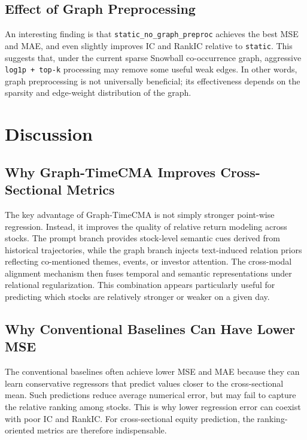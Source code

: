 \subsection{Effect of Graph Preprocessing}

An interesting finding is that \texttt{static\_no\_graph\_preproc} achieves the best MSE and MAE, and even slightly improves IC and RankIC relative to \texttt{static}. This suggests that, under the current sparse Snowball co-occurrence graph, aggressive \texttt{log1p + top-k} processing may remove some useful weak edges. In other words, graph preprocessing is not universally beneficial; its effectiveness depends on the sparsity and edge-weight distribution of the graph.

\section{Discussion}

\subsection{Why Graph-TimeCMA Improves Cross-Sectional Metrics}

The key advantage of Graph-TimeCMA is not simply stronger point-wise regression. Instead, it improves the quality of relative return modeling across stocks. The prompt branch provides stock-level semantic cues derived from historical trajectories, while the graph branch injects text-induced relation priors reflecting co-mentioned themes, events, or investor attention. The cross-modal alignment mechanism then fuses temporal and semantic representations under relational regularization. This combination appears particularly useful for predicting which stocks are relatively stronger or weaker on a given day.

\subsection{Why Conventional Baselines Can Have Lower MSE}

The conventional baselines often achieve lower MSE and MAE because they can learn conservative regressors that predict values closer to the cross-sectional mean. Such predictions reduce average numerical error, but may fail to capture the relative ranking among stocks. This is why lower regression error can coexist with poor IC and RankIC. For cross-sectional equity prediction, the ranking-oriented metrics are therefore indispensable.

